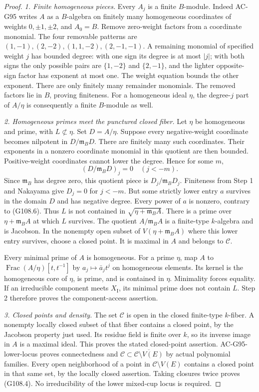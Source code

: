 \begin{proof}
\emph{1. Finite homogeneous pieces.}
Every $A_j$ is a finite $B$-module.  Indeed AC-G95 writes $A$ as a
$B$-algebra on finitely many homogeneous coordinates of weights
$0,\pm1,\pm2$, and $A_0=B$.  Remove zero-weight factors from a
coordinate monomial.  The four removable patterns are
$(1,-1),(2,-2),(1,1,-2),(2,-1,-1)$.  A remaining monomial of
specified weight $j$ has bounded degree: with one sign its degree
is at most $|j|$; with both signs the only possible pairs are
$\{1,-2\}$ and $\{2,-1\}$, and the lighter opposite-sign factor
has exponent at most one.  The weight equation bounds the other
exponent.  There are only finitely many remainder monomials.
The removed factors lie in $B$, proving finiteness.
For a homogeneous ideal $\eta$, the degree-$j$ part of $A/\eta$
is consequently a finite $B$-module as well.

\emph{2. Homogeneous primes meet the punctured closed fiber.}
Let $\eta$ be homogeneous and prime, with $L\not\subset\eta$.
Set $D=A/\eta$.  Suppose every negative-weight coordinate becomes
nilpotent in $D/\mathfrak m_BD$.  There are finitely many such
coordinates.  Their exponents in a nonzero coordinate monomial
in this quotient are then bounded.  Positive-weight coordinates
cannot lower the degree.  Hence for some $m$,
\[
 (D/\mathfrak m_BD)_j=0\quad(j<-m).
 \tag{G108.6}
\]
Since $\mathfrak m_B$ has degree zero, this quotient piece is
$D_j/\mathfrak m_BD_j$.  Finiteness from Step 1 and Nakayama give
$D_j=0$ for $j<-m$.  But some strictly lower entry $a$ survives
in the domain $D$ and has negative degree.  Every power of $a$
is nonzero, contrary to (G108.6).  Thus $L$ is not contained in
$\sqrt{\eta+\mathfrak m_BA}$.
There is a prime over $\eta+\mathfrak m_BA$ at which $L$ survives.
The quotient $A/\mathfrak m_BA$ is a finite-type $k$-algebra and
is Jacobson.  In the nonempty open subset of
$V(\eta+\mathfrak m_BA)$ where this lower entry survives, choose
a closed point.  It is maximal in $A$ and belongs to $\mathcal C$.

Every minimal prime of $A$ is homogeneous.  For a prime $\eta$,
map $A$ to $\operatorname{Frac}(A/\eta)[t,t^{-1}]$ by
$a_j\mapsto\bar a_jt^j$ on homogeneous elements.  Its kernel
is the homogeneous core of $\eta$, is prime, and is contained in
$\eta$.  Minimality forces equality.  If an irreducible component
meets $X_{\mathrm I}$, its minimal prime does not contain $L$.
Step 2 therefore proves the component-access assertion.

\emph{3. Closed points and density.}
The set $\mathcal C$ is open in the closed finite-type $k$-fiber.
A nonempty locally closed subset of that fiber contains a closed
point, by the Jacobson property just used.  Its residue field is
finite over $k$, so its inverse image in $A$ is a maximal ideal.
This proves the stated closed-point assertion.
AC-G95-lower-locus proves connectedness and
$\mathcal C\subset\overline{\mathcal C\setminus V(E)}$ by actual
polynomial families.  Every open neighborhood of a point in
$\mathcal C\setminus V(E)$ contains a closed point in that same
set, by the locally closed assertion.  Taking closures twice
proves (G108.4).  No irreducibility of the lower mixed-cup locus
is required.


\end{proof}
